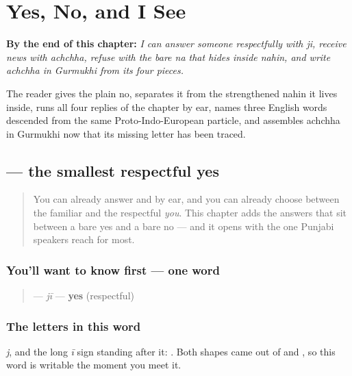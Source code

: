 
\chapter{Yes, No, and I See}
\label{ch:pa-three-answers}

\begin{chapteropening}
\textbf{By the end of this chapter:} \emph{I can answer someone respectfully with ji, receive news with achchha, refuse with the bare na that hides inside nahin, and write achchha in Gurmukhi from its four pieces.}

The reader gives the plain no, separates it from the strengthened nahin it lives inside, runs all four replies of the chapter by ear, names three English words descended from the same Proto-Indo-European particle, and assembles achchha in Gurmukhi now that its missing letter has been traced.
\end{chapteropening}

\section[\texorpdfstring{\pa{ਜੀ} (jī)}{ਜੀ (jī)}]{ — the smallest respectful yes}

\label{lesson:PA-C31-ji}



\begin{quote}
You can already answer \textbf{} and \textbf{} by ear, and you can already choose between the familiar and the respectful \emph{you}. This chapter adds the answers that sit between a bare yes and a bare no — and it opens with the one Punjabi speakers reach for most.
\end{quote}

\subsection*{You'll want to know first — one word}
\begin{quote}
\textbf{} — \emph{jī} — \textbf{yes} (respectful)
\end{quote}

\subsection*{The letters in this word}
\textbf{} \emph{j}, and the long \emph{ī} sign \textbf{} standing after it: \textbf{}. Both shapes came out of \textbf{} and \textbf{}, so this word is writable the moment you meet it.

